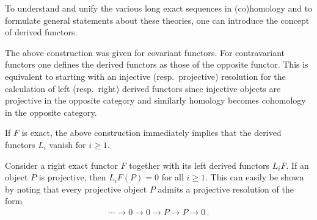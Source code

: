 	To understand and unify the various long exact sequences in (co)homology and to formulate general statements about these theories, one can introduce the concept of derived functors.

	\begin{remark}
        The above construction was given for covariant functors. For contravariant functors one defines the derived functors as those of the opposite functor. This is equivalent to starting with an injective (resp.~projective) resolution for the calculation of left (resp.~right) derived functors since injective objects are projective in the opposite category and similarly homology becomes cohomology in the opposite category.
    \end{remark}

	\begin{property}\label{homalg:exact_vanishing_derived_functor}
		If $F$ is exact, the above construction immediately implies that the derived functors $L_i$ vanish for $i\geq 1$.
	\end{property}

	\begin{property}\label{homalg:projective_object}
		Consider a right exact functor $F$ together with its left derived functors $L_iF$. If an object $P$ is projective, then $L_iF(P)=0$ for all $i\geq1$. This can easily be shown by noting that every projective object $P$ admits a projective resolution of the form
		\begin{gather}
			\cdots\longrightarrow0\longrightarrow0\longrightarrow P\longrightarrow P\longrightarrow0\,.
		\end{gather}
	\end{property}

